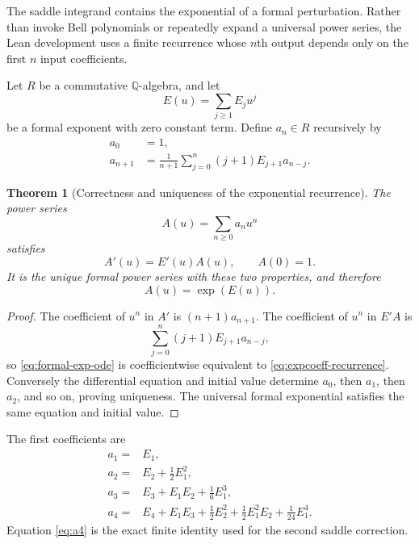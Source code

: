 \documentclass[11pt,oneside]{article}
\newtheorem{theorem}{Theorem}[section]
\theoremstyle{definition}
\theoremstyle{remark}
\newcommand{\Q}{\mathbb Q}
\begin{document}
The saddle integrand contains the exponential of a formal perturbation.  Rather than invoke
Bell polynomials or repeatedly expand a universal power series, the Lean development uses a
finite recurrence whose $n$th output depends only on the first $n$ input coefficients.

Let $R$ be a commutative $\Q$-algebra, and let
\begin{equation}
 E(u)=\sum_{j\ge1}E_j u^j
 \label{eq:formal-exponent}
\end{equation}
be a formal exponent with zero constant term.  Define $a_n\in R$ recursively by
\begin{align}
 a_0&=1,                                                    \label{eq:expcoeff-zero}\\
 a_{n+1}&=\frac1{n+1}\sum_{j=0}^{n}(j+1)E_{j+1}a_{n-j}.
                                                               \label{eq:expcoeff-recurrence}
\end{align}

\begin{theorem}[Correctness and uniqueness of the exponential recurrence]
\label{thm:expcoeff-correctness}
The power series
\begin{equation}
 A(u)=\sum_{n\ge0}a_nu^n
 \label{eq:formal-mass-series}
\end{equation}
satisfies
\begin{equation}
 A'(u)=E'(u)A(u),
 \qquad
 A(0)=1.
 \label{eq:formal-exp-ode}
\end{equation}
It is the unique formal power series with these two properties, and therefore
\begin{equation}
 A(u)=\exp(E(u)).
 \label{eq:formal-exp-identification}
\end{equation}
\end{theorem}

\begin{proof}
The coefficient of $u^n$ in $A'$ is $(n+1)a_{n+1}$.  The coefficient of $u^n$ in $E'A$ is
\[
 \sum_{j=0}^{n}(j+1)E_{j+1}a_{n-j},
\]
so \eqref{eq:formal-exp-ode} is coefficientwise equivalent to
\eqref{eq:expcoeff-recurrence}.  Conversely the differential equation and initial value
determine $a_0$, then $a_1$, then $a_2$, and so on, proving uniqueness.  The universal
formal exponential satisfies the same equation and initial value.
\end{proof}

The first coefficients are
\begin{align}
 a_1={}&E_1,                                                  \label{eq:a1}\\
 a_2={}&E_2+\frac12E_1^2,                                    \label{eq:a2}\\
 a_3={}&E_3+E_1E_2+\frac16E_1^3,                             \label{eq:a3}\\
 a_4={}&E_4+E_1E_3+\frac12E_2^2
       +\frac12E_1^2E_2+\frac1{24}E_1^4.                    \label{eq:a4}
\end{align}
Equation \eqref{eq:a4} is the exact finite identity used for the second saddle correction.
\end{document}
